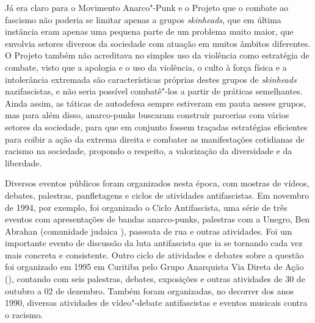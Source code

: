 Já era claro para o Movimento Anarco"-Punk e o Projeto  que o combate ao fascismo não poderia se limitar apenas a grupos \emph{skinheads}, que em última instância eram apenas uma pequena parte de um problema muito maior, que envolvia setores diversos da sociedade com atuação em muitos âmbitos diferentes. O Projeto  também não acreditava no simples uso da violência como estratégia de combate, visto que a apologia e o uso da violência, o culto à força física e a intolerância extremada são características próprias destes grupos de \emph{skinheads} nazifascistas, e não seria possível combatê"-los a partir de práticas semelhantes. Ainda assim, as táticas de autodefesa sempre estiveram em pauta nesses grupos, mas para além disso, anarco-punks buscaram construir parcerias com vários setores da sociedade, para que em conjunto fossem traçadas estratégias eficientes para coibir a ação da extrema direita e combater as manifestações cotidianas de racismo na sociedade, propondo o respeito, a valorização da diversidade e da liberdade.

Diversos eventos públicos foram organizados nesta época, com mostras de vídeos, debates, palestras, panfletagens e ciclos de atividades antifascistas. Em novembro de 1994, por exemplo, foi organizado o Ciclo Antifascista, uma série de três eventos com apresentações de bandas anarco-punks, palestras com a Unegro, Ben Abrahan (comunidade judaica ), passeata de rua e outras atividades. Foi um importante evento de discussão da luta antifascista que ia se tornando cada vez mais concreta e consistente.  Outro ciclo de atividades e debates sobre a questão foi organizado em 1995 em Curitiba pelo Grupo Anarquista Via Direta de Ação (), contando com seis palestras, debates, exposições e outras atividades de 30 de outubro a 02 de dezembro. Também foram organizadas, no decorrer dos anos 1990, diversas atividades de vídeo"-debate antifascistas e eventos musicais contra o racismo.

